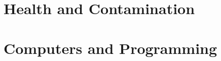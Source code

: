 \section{Health and Contamination}\label{sec:healthandcontamination}


\section{Computers and Programming}\label{sec:computers}





